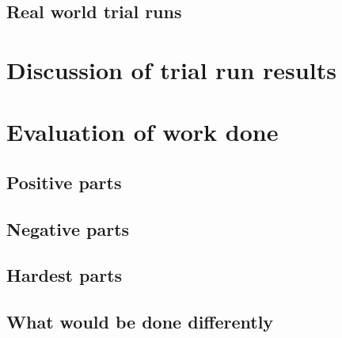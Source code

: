 \documentclass[a4paper,12pt]{article}
\begin{document}
\subsection{Real world trial runs}

\section{Discussion of trial run results}

\section{Evaluation of work done}

\subsection{Positive parts}

\subsection{Negative parts}

\subsection{Hardest parts}

\subsection{What would be done differently}
\end{document}
